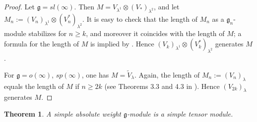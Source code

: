 \documentclass{amsart}
\renewcommand{\sl}{sl}
\newcommand{\so}{o}
\renewcommand{\sp}{sp}
\renewcommand{\gg}{\mathfrak{g}}
\newtheorem{thm}{Theorem}[section]
\theoremstyle{definition}
\numberwithin{equation}{section}
\begin{document}
\begin{proof}
Let $\gg=\sl(\infty)$.  Then $M =V_{\lambda^1}\otimes (V_*)_{\lambda^2}$, 
and let $M_n:=(V_n)_{\lambda^1} \otimes (V_n^*)_{\lambda^2}$. It is easy to check that the length of $M_n$ as a $\gg_n$-module stabilizes for $n \geq k$, and moreover it coincides with the length of $M$; a formula for the length of $M$ is implied by \cite[Theorem 2.3]{PStyr}.  Hence $(V_k)_{\lambda^1} \otimes (V_k^*)_{\lambda^2}$ generates $M$.

For $\gg = \so(\infty)$, $\sp(\infty)$, one has
$M=\tilde{V}_{\lambda}$. Again, the length of $M_n:= (V_n)_\lambda$ equals the length of $M$ if $n\geq 2k$ (see Theorems 3.3 and 4.3 in \cite{PStyr}). Hence $(V_{2k})_\lambda$ generates $M$.
\end{proof}


\begin{thm} \label{simples}
A simple absolute weight $\gg$-module is a simple tensor module.
\end{thm}
\end{document}
